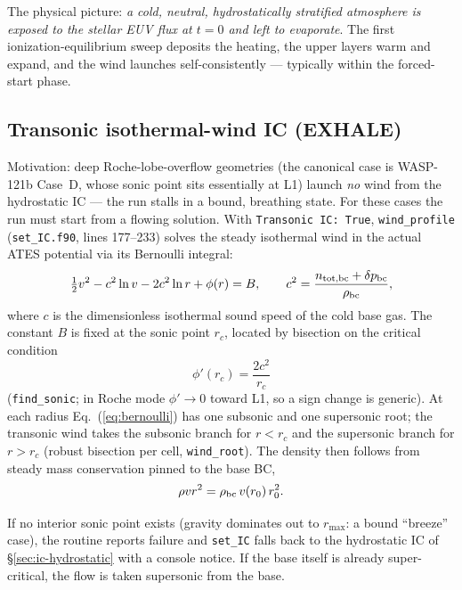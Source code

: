 \documentclass[english,a4paper]{kiseon_memo}
\begin{document}
The physical picture: \emph{a cold, neutral, hydrostatically stratified
atmosphere is exposed to the stellar EUV flux at $t=0$ and left to
evaporate}. The first ionization-equilibrium sweep deposits the
heating, the upper layers warm and expand, and the wind launches
self-consistently --- typically within the forced-start phase.

\subsection{Transonic isothermal-wind IC (EXHALE)}
\label{sec:ic-transonic}

Motivation: deep Roche-lobe-overflow geometries (the canonical case is
WASP-121b Case~D, whose sonic point sits essentially at L1) launch
\emph{no} wind from the hydrostatic IC --- the run stalls in a bound,
breathing state. For these cases the run must start from a flowing
solution. With \texttt{Transonic IC: True}, \texttt{wind\_profile}
(\texttt{set\_IC.f90}, lines 177--233) solves the steady isothermal
wind in the actual ATES potential via its Bernoulli integral:
\begin{equation}
\tfrac12 v^2 - c^2 \ln v - 2c^2 \ln r + \phi(r) = B,
\qquad
c^2 = \frac{n_{\rm tot,bc} + \delta p_{\rm bc}}{\rho_{\rm bc}},
\label{eq:bernoulli}
\end{equation}
where $c$ is the dimensionless isothermal sound speed of the cold base
gas. The constant $B$ is fixed at the sonic point $r_c$, located by
bisection on the critical condition
\begin{equation}
\phi'(r_c) = \frac{2c^2}{r_c}
\end{equation}
(\texttt{find\_sonic}; in Roche mode $\phi' \to 0$ toward L1, so a
sign change is generic). At each radius Eq.~(\ref{eq:bernoulli}) has
one subsonic and one supersonic root; the transonic wind takes the
subsonic branch for $r < r_c$ and the supersonic branch for $r > r_c$
(robust bisection per cell, \texttt{wind\_root}). The density then
follows from steady mass conservation pinned to the base BC,
\begin{equation}
\rho v r^2 = \rho_{\rm bc}\, v(r_0)\, r_0^2 .
\end{equation}

If no interior sonic point exists (gravity dominates out to
$r_{\max}$: a bound ``breeze'' case), the routine reports failure and
\texttt{set\_IC} falls back to the hydrostatic IC of
\S\ref{sec:ic-hydrostatic} with a console notice. If the base itself
is already super-critical, the flow is taken supersonic from the base.
\end{document}
